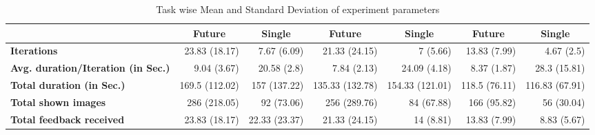 \documentclass[english]{tktltiki}
\begin{document}
\begin{table}
\begin{center}
{\begin{tabular}{|l|r|r|r|r|r|r|}
        \multicolumn{1}{|c|}{} & \multicolumn{1}{|c|}{\textbf{Future}} & \multicolumn{1}{|c|}{\textbf{Single}} & \multicolumn{1}{|c|}{\textbf{Future}} & \multicolumn{1}{|c|}{\textbf{Single}} & \multicolumn{1}{|c|}{\textbf{Future}} & \multicolumn{1}{|c|}{\textbf{Single}} \\
        \hline
        
        \multicolumn{1}{|l|}{\textbf{Iterations}} & 23.83 (18.17) & 7.67 (6.09) & 21.33 (24.15) & 7 (5.66) & 13.83 (7.99) & 4.67 (2.5) \\
        \hline
        
        \multicolumn{1}{|l|}{\textbf{Avg. duration/Iteration (in Sec.)}} & 9.04 (3.67) & 20.58 (2.8) & 7.84 (2.13) & 24.09  (4.18) & 8.37 (1.87) & 28.3 (15.81) \\
        \hline
        
        \multicolumn{1}{|l|}{\textbf{Total duration (in Sec.)}} & 169.5 (112.02) & 157 (137.22) & 135.33 (132.78) & 154.33 (121.01) & 118.5 (76.11) & 116.83 (67.91) \\
        \hline
        
        \multicolumn{1}{|l|}{\textbf{Total shown images}} & 286 (218.05) & 92 (73.06) & 256 (289.76) & 84 (67.88) & 166 (95.82) & 56 (30.04) \\
        \hline
        
        \multicolumn{1}{|l|}{\textbf{Total feedback received}} & 23.83 (18.17) & 22.33 (23.37) & 21.33 (24.15) & 14 (8.81) & 13.83 (7.99) & 8.83 (5.67) \\
        \hline

    \end{tabular}
    }
	\end{center}
	\caption{Task wise Mean and Standard Deviation of experiment parameters}
    \label{table:exp_mean_std_task}
\end{table}


\iffalse
\end{document}

